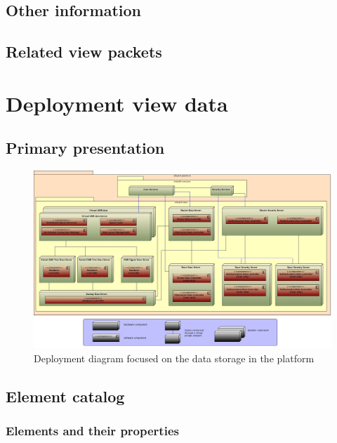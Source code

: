 \documentclass[a4paper,10pt]{article}
\begin{document}
\subsection{Other information}

\subsection{Related view packets}



\clearpage
\section{Deployment view data}
\label{sec:deployment_data}

\subsection{Primary presentation}
\begin{center}
    \begin{figure}[!h]
      \includegraphics[width=\textwidth]{../images/deployment_data.jpg}
	\caption{Deployment diagram focused on the data storage in the platform}
    \end{figure}
  \end{center}

\subsection{Element catalog}

\subsubsection{Elements and their properties}
\end{document}
